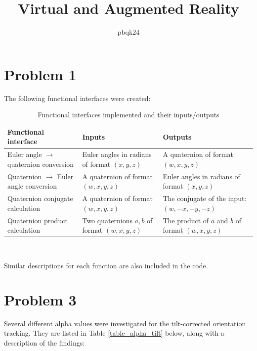 \documentclass[11pt,a4paper]{article}
\title{\vspace{-2em}Virtual and Augmented Reality}
\author{pbqk24}
\begin{document}
	\maketitle
	
	\vspace{-3em}
	
	\section*{Problem 1}	
	The following functional interfaces were created:
	
	\begin{table}[h!]
		\caption{Functional interfaces implemented and their inputs/outputs}
		\label{table_functional_interfaces}
		\begin{tabu} to 1.0\linewidth {|X[l]|X[l]|X[l]|}	
			\hline
			\textbf{Functional interface}&\textbf{Inputs}&\textbf{Outputs}\\
			\hline
			Euler angle $\rightarrow$ quaternion conversion&Euler angles in radians of format $(x, y, z)$&A quaternion of format $(w, x, y, z)$\\
			\hline
			Quaternion $\rightarrow$ Euler angle conversion&A quaternion of format $(w, x, y, z)$&Euler angles in radians of format $(x, y, z)$\\
			\hline
			Quaternion conjugate calculation&A quaternion of format $(w, x, y, z)$& The conjugate of the input: $(w, -x, -y, -z)$\\
			\hline
			Quaternion product calculation&Two quaternions $a, b$ of format $(w, x, y, z)$&The product of $a$ and $b$ of format $(w, x, y, z)$\\
			\hline
		\end{tabu}\\
	\end{table}

	\noindent Similar descriptions for each function are also included in the code.
	
	\section*{Problem 3}
	
	Several different alpha values were investigated for the tilt-corrected orientation tracking. They are listed in Table \ref{table_alpha_tilt} below, along with a description of the findings:
	
\end{document}
